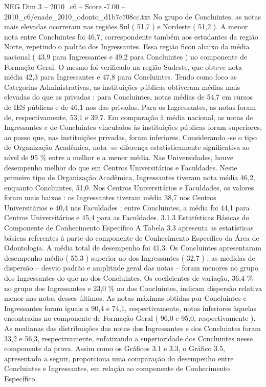 \begin{textsample}{NEG Dim 3 – 2010\_c6 – Score -7.00 – 2010\_c6/enade\_2010\_odonto\_d1b7c708cc.txt}
No grupo de Concluintes, as notas mais elevadas ocorreram nas regiões Sul ( 51,7 ) e Nordeste ( 51,2 ).
A menor nota entre Concluintes foi 46,7, correspondente também aos estudantes da região Norte, repetindo o padrão dos Ingressantes.
Essa região ficou abaixo da média nacional ( 43,9 para Ingressantes e 49,2 para Concluintes ) no componente de Formação Geral.
O mesmo foi verificado na região Sudeste, que obteve nota média 42,3 para Ingressantes e 47,8 para Concluintes.
Tendo como foco as Categorias Administrativas, as instituições públicas obtiveram médias mais elevadas do que as privadas : para Concluintes, notas médias de 54,7 em cursos de IES públicas e de 46,1 nos das privadas.
Para os Ingressantes, as notas foram de, respectivamente, 53,1 e 39,7.
Em comparação à média nacional, as notas de Ingressantes e de Concluintes vinculados às instituições públicas foram superiores, ao passo que, nas instituições privadas, foram inferiores.
Considerando -se o tipo de Organização Acadêmica, nota -se diferença estatisticamente significativa ao nível de 95 \% entre a melhor e a menor média.
Nas Universidades, houve desempenho melhor do que em Centros Universitários e Faculdades.
Neste primeiro tipo de Organização Acadêmica, Ingressantes tiveram nota média 46,2, enquanto Concluintes, 51,0.
Nos Centros Universitários e Faculdades, os valores foram mais baixos : os Ingressantes tiveram média 38,7 nos Centros Universitários e 40,4 nas Faculdades ; entre Concluintes, a média foi 44,1 para Centros Universitários e 45,4 para as Faculdades. 3.1.3 Estatísticas Básicas do Componente de Conhecimento Específico A Tabela 3.3 apresenta as estatísticas básicas referentes à parte do componente de Conhecimento Específico da Área de Odontologia.
A média total de desempenho foi 41,3.
Os Concluintes apresentaram desempenho médio ( 55,3 ) superior ao dos Ingressantes ( 32,7 ) ; as medidas de dispersão – desvio padrão e amplitude geral das notas – foram menores no grupo dos Ingressantes do que no dos Concluintes.
Os coeficientes de variação, 36,4 \% no grupo dos Ingressantes e 23,0 \% no dos Concluintes, indicam dispersão relativa menor nas notas desses últimos.
As notas máximas obtidas por Concluintes e Ingressantes foram iguais a 90,4 e 74,1, respectivamente, notas inferiores àquelas encontradas no componente de Formação Geral ( 96,0 e 95,0, respectivamente ).
As medianas das distribuições das notas dos Ingressantes e dos Concluintes foram 33,2 e 56,3, respectivamente, enfatizando a superioridade dos Concluintes nesse componente da prova.
Assim como os Gráficos 3.1 e 3.3, o Gráfico 3.5, apresentado a seguir, proporciona uma comparação do desempenho entre Concluintes e Ingressantes, em relação ao componente de Conhecimento Específico.

\end{textsample}
